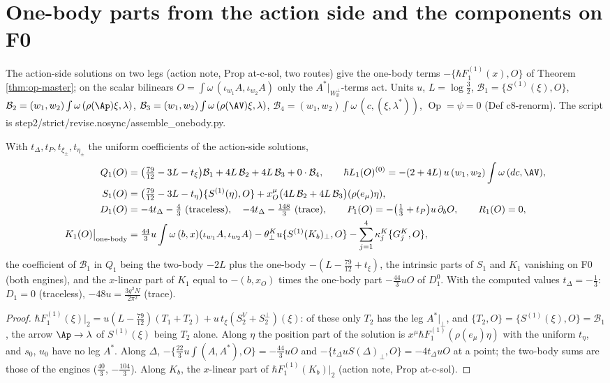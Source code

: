 \section{One-body parts from the action side and the components on F0}
\label{sec:op-F0}

The action-side solutions on two legs (action note, Prop at-c-sol, two routes) give the one-body terms $-\{\hbar F_1^{(1)}(x),O\}$ of Theorem \ref{thm:op-master}; on the scalar bilinears $O=\int\omega\,(\iota_{w_1}A,\iota_{w_2}A)$ only the $A^*|_{W^\perp_{\mathbb R}}$-terms act. Units $u$, $L=\log\tfrac32$, $\mathcal B_1=\{S^{(1)}(\xi),O\}$, $\mathcal B_2=(w_1,w_2)\int\omega\,(\rho(\Ap)\xi,\lambda)$, $\mathcal B_3=(w_1,w_2)\int\omega\,(\rho(\AV)\xi,\lambda)$, $\mathcal B_4=(w_1,w_2)\int\omega\,(c,(\xi,\lambda^*))$, $\operatorname{Op}=\psi=0$ (Def c8-renorm). The script is step2/strict/revise.nosync/assemble\_onebody.py.

\begin{proposition}[Components on F0]
\label{prop:op-F0}
With $t_\Delta,t_P,t_{\xi_\pm},t_{\eta_\pm}$ the uniform coefficients of the action-side solutions,
\[
\begin{aligned}
Q_1(O)&=\big(\tfrac{79}{12}-3L-t_{\xi}\big)\mathcal B_1+4L\,\mathcal B_2+4L\,\mathcal B_3+0\cdot\mathcal B_4,\qquad \hbar L_1(O)^{(0)}=-(2+4L)\,u\,(w_1,w_2)\int\omega\,(dc,\AV),\\
S_1(O)&=\big(\tfrac{79}{12}-3L-t_{\eta}\big)\{S^{(1)}(\eta),O\}+x_O^\mu\big(4L\,\mathcal B_2+4L\,\mathcal B_3\big)(\rho(e_\mu)\eta),\\
D_1(O)&=-4t_\Delta-\tfrac43\ (\text{traceless}),\quad -4t_\Delta-\tfrac{148}3\ (\text{trace}),\qquad P_1(O)=-\big(\tfrac13+t_P\big)u\,\partial_bO,\qquad R_1(O)=0,\\
K_1(O)\big|_{\text{one-body}}&=\tfrac{44}3u\int\omega\,(b,x)(\iota_{w_1}A,\iota_{w_2}A)-\theta^K_\perp u\{S^{(1)}(K_b)_\perp,O\}-\sum_{j=1}^4\kappa^K_j\{G^K_j,O\},
\end{aligned}
\]
the coefficient of $\mathcal B_1$ in $Q_1$ being the two-body $-2L$ plus the one-body $-(L-\tfrac{79}{12}+t_\xi)$, the intrinsic parts of $S_1$ and $K_1$ vanishing on F0 (both engines), and the $x$-linear part of $K_1$ equal to $-(b,x_O)$ times the one-body part $-\tfrac{44}3uO$ of $D^0_1$. With the computed values $t_\Delta=-\tfrac13$: $D_1=0$ (traceless), $-48u=\tfrac{3g^2N}{2\pi^2}$ (trace).
\end{proposition}

\begin{proof}
$\hbar F_1^{(1)}(\xi)|_2=u(L-\tfrac{79}{12})(T_1+T_2)+u\,t_\xi(S^V_2+S^\perp_2)(\xi)$: of these only $T_2$ has the leg $A^*|_\perp$, and $\{T_2,O\}=\{S^{(1)}(\xi),O\}=\mathcal B_1$, the arrow $\Ap\to\lambda$ of $S^{(1)}(\xi)$ being $T_2$ alone. Along $\eta$ the position part of the solution is $x^\mu\hbar F_1^{(1)}(\rho(e_\mu)\eta)$ with the uniform $t_\eta$, and $s_0$, $u_0$ have no leg $A^*$. Along $\Delta$, $-\{\tfrac{22}3u\int(A,A^*),O\}=-\tfrac{44}3uO$ and $-\{t_\Delta uS(\Delta)_\perp,O\}=-4t_\Delta uO$ at a point; the two-body sums are those of the engines ($\tfrac{40}3$, $-\tfrac{104}3$). Along $K_b$, the $x$-linear part of $\hbar F_1^{(1)}(K_b)|_2$ (action note, Prop at-c-sol).
\end{proof}

